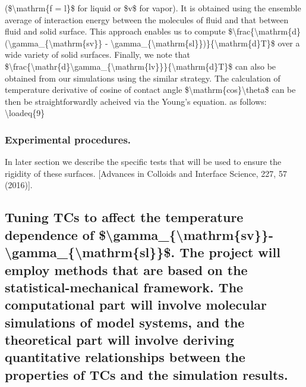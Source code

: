 (\$\textbackslash mathrm\{f = l\}\$ for liquid or \$v\$ for vapor). It is obtained using the ensemble average of interaction energy between the molecules of fluid and that between fluid and solid surface. This approach enables us to compute \$\textbackslash frac\{\textbackslash mathrm\{d\}(\textbackslash gamma\_\{\textbackslash mathrm\{sv\}\} - \textbackslash gamma\_\{\textbackslash mathrm\{sl\}\})\}\{\textbackslash mathrm\{d\}T\}\$ over a wide variety of solid surfaces. Finally, we note that \$\textbackslash frac\{\textbackslash mathr\{d\}\textbackslash gamma\_\{\textbackslash mathrm\{lv\}\}\}\{\textbackslash mathrm\{d\}T\}\$ can also be obtained from our simulations using the similar strategy. The calculation of temperature derivative of cosine of contact angle \$\textbackslash mathrm\{cos\}\textbackslash theta\$ can be then be straightforwardly acheived via the Young's equation. as follows: \textbackslash loadeq\{9\}\subsubsection{Experimental procedures.}

\par In later section we describe the specific tests that will be used to ensure the rigidity of these surfaces. [Advances in Colloids and Interface Science, 227, 57 (2016)].\subsection{Tuning TCs to affect the temperature dependence of \$\textbackslash gamma\_\{\textbackslash mathrm\{sv\}\}-\textbackslash gamma\_\{\textbackslash mathrm\{sl\}\}\$. The project will employ methods that are based on the statistical-mechanical framework. The computational part will involve molecular simulations of model systems, and the theoretical part will involve deriving quantitative relationships between the properties of TCs and the simulation results.}
